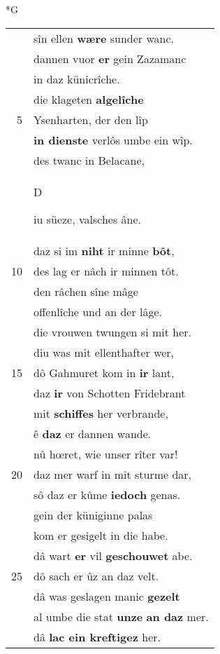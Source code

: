 \documentclass[8pt,a4paper,notitlepage]{article}
\begin{document}
\newpage
\begin{table}[ht]
\begin{minipage}[t]{0.5\linewidth}
\small
\begin{center}*G
\end{center}
\begin{tabular}{rl}
 & sîn ellen \textbf{wære} sunder wanc.\\ 
 & dannen vuor \textbf{er} gein Zazamanc\\ 
 & in daz künicrîche.\\ 
 & die klageten \textbf{algelîche}\\ 
5 & Ysenharten, der den lîp\\ 
 & \textbf{in dienste} verlôs umbe ein wîp.\\ 
 & des twanc in Belacane,\\ 
 & \begin{large}D\end{large}iu süeze, valsches âne.\\ 
 & daz si im \textbf{niht} ir minne \textbf{bôt},\\ 
10 & des lag er nâch ir minnen tôt.\\ 
 & den râchen sîne mâge\\ 
 & offenlîche und an der lâge.\\ 
 & die vrouwen twungen si mit her.\\ 
 & diu was mit ellenthafter wer,\\ 
15 & dô Gahmuret kom in \textbf{ir} lant,\\ 
 & daz \textbf{ir} von Schotten Fridebrant\\ 
 & mit \textbf{schiffes} her verbrande,\\ 
 & ê \textbf{daz} er dannen wande.\\ 
 & nû hœret, wie unser rîter var!\\ 
20 & daz mer warf in mit sturme dar,\\ 
 & sô daz er kûme \textbf{iedoch} genas.\\ 
 & gein der küniginne palas\\ 
 & kom er gesigelt in die habe.\\ 
 & dâ wart \textbf{er} vil \textbf{geschouwet} abe.\\ 
25 & dô sach er ûz an daz velt.\\ 
 & dâ was geslagen manic \textbf{gezelt}\\ 
 & al umbe die stat \textbf{unze} \textbf{an daz} mer.\\ 
 & dâ \textbf{lac ein kreftigez} her.\\ 

\end{tabular}
\end{minipage}
\end{table}
\end{document}
